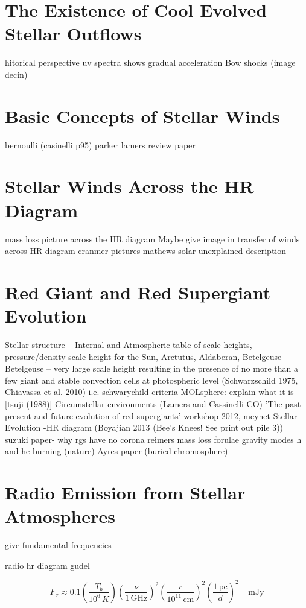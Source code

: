 \section{The Existence of Cool Evolved Stellar Outflows}\label{sec:2}
hitorical perspective
uv spectra shows gradual acceleration
Bow shocks (image decin)

\section{Basic Concepts of Stellar Winds}\label{sec:2}
bernoulli (casinelli p95) parker
lamers review paper

\section{Stellar Winds Across the HR Diagram}
mass loss picture across the HR diagram
Maybe give image in transfer of winds across HR diagram
cranmer pictures
mathews solar unexplained description

\section{Red Giant and Red Supergiant Evolution}\label{sec:3}
Stellar structure – Internal and Atmospheric
table of scale heights, pressure/density scale height for the Sun, Arctutus, Aldaberan, Betelgeuse
Betelgeuse – very large scale height  resulting in the
presence of no more than a few giant and stable convection cells at photospheric
level (Schwarzschild 1975, Chiavassa et al. 2010) i.e. schwarychild criteria
MOLsphere: explain what it is [tsuji (1988)]
Circumstellar environments (Lamers and Cassinelli CO)
'The past present and future evolution of red supergiants' workshop 2012, meynet
Stellar Evolution -HR diagram (Boyajian 2013 (Bee's Knees! See print out pile 3))
suzuki paper- why rgs have no corona
reimers mass loss forulae
gravity modes h and he burning (nature)
Ayres paper (buried chromosphere)

\section{Radio Emission from Stellar Atmospheres} 
give fundamental frequencies

radio hr diagram gudel


\begin{equation}
F_{\nu}\approx 0.1\left(\frac{T_{b}}{10^6\,K}\right)\left(\frac{\nu}{1\,\mathrm{GHz}}\right)^2\left(\frac{r}{10^{11}\,\mathrm{cm}}\right)^2\left(\frac{1\,\mathrm{pc}}{d}\right)^2\ \ \ \ \ \mathrm{mJy}
\end{equation}
\citep{gudel_2002}

